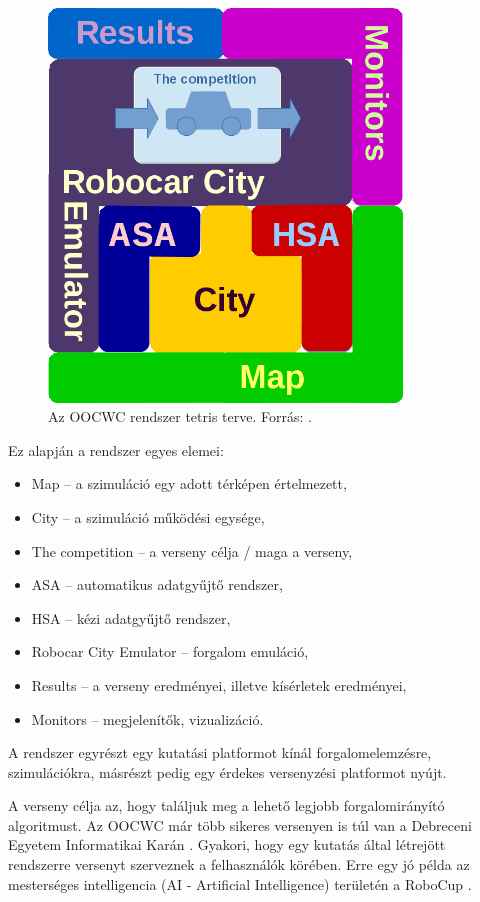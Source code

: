 \documentclass[a4paper,12pt]{report}
\begin{document}
\begin{figure}[ht]
\centerline{
\includegraphics[width=3.7in]{img/tetris_plan}}
\caption{Az OOCWC rendszer tetris terve. Forrás: \cite{oocwcrepo}.}
\label{basedesign}
\end{figure}

Ez alapján a rendszer egyes elemei:

\begin{itemize}
\item Map -- a szimuláció egy adott térképen értelmezett,
\item City -- a szimuláció működési egysége,
\item The competition -- a verseny célja / maga a verseny,
\item ASA -- automatikus adatgyűjtő rendszer,
\item HSA -- kézi adatgyűjtő rendszer,
\item Robocar City Emulator -- forgalom emuláció,
\item Results -- a verseny eredményei, illetve kísérletek eredményei,
\item Monitors -- megjelenítők, vizualizáció.
\end{itemize}

A rendszer egyrészt egy kutatási platformot kínál forgalomelemzésre, szimulációkra, másrészt pedig egy érdekes versenyzési platformot nyújt.

\vspace{2mm}
A verseny célja az, hogy találjuk meg a lehető legjobb forgalomirányító algoritmust. Az OOCWC már több sikeres versenyen is túl van a Debreceni Egyetem Informatikai Karán \cite{competitions}. Gyakori, hogy egy kutatás által létrejött rendszerre versenyt szerveznek a felhasználók körében. Erre egy jó példa az mesterséges intelligencia (AI - Artificial Intelligence) területén a RoboCup \cite{robocup}.
\end{document}
